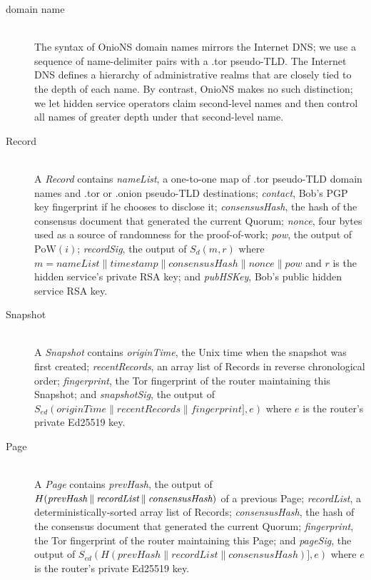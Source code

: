 \documentclass{sig-alternate}
\newcommand*\concat{\mathbin{\|}}
\begin{document}
\begin{description}
	\item[domain name] \hfill \\
		The syntax of OnioNS domain names mirrors the Internet DNS; we use a sequence of name-delimiter pairs with a .tor pseudo-TLD. The Internet DNS defines a hierarchy of administrative realms that are closely tied to the depth of each name. By contrast, OnioNS makes no such distinction; we let hidden service operators claim second-level names and then control all names of greater depth under that second-level name.

	\item[Record] \hfill \\
		A \emph{Record} contains \emph{nameList}, a one-to-one map of .tor pseudo-TLD domain names and .tor or .onion pseudo-TLD destinations; \emph{contact}, Bob's PGP key fingerprint if he chooses to disclose it; \emph{consensusHash}, the hash of the consensus document that generated the current Quorum; \emph{nonce}, four bytes used as a source of randomness for the proof-of-work; \emph{pow}, the output of $ \mathrm{PoW}(i) $; \emph{recordSig}, the output of $ S_{d}(m, r) $ where $ m = \mathit{nameList} \concat \mathit{timestamp} \concat \mathit{consensusHash} \concat \mathit{nonce} \concat \mathit{pow} $ and $ r $ is the hidden service's private RSA key; and \emph{pubHSKey}, Bob's public hidden service RSA key.

	\item[Snapshot] \hfill \\
		A \emph{Snapshot} contains \emph{originTime}, the Unix time when the snapshot was first created; \emph{recentRecords}, an array list of Records in reverse chronological order; \emph{fingerprint}, the Tor fingerprint of the router maintaining this Snapshot; and  \emph{snapshotSig}, the output of $ S_{\mathit{ed}}(\mathit{originTime} \concat \mathit{recentRecords} \concat \mathit{fingerprint}], e) $ where $ e $ is the router's private Ed25519 key.

	\item[Page] \hfill \\
		A \emph{Page} contains \emph{prevHash}, the output of $ H(\emph{prevHash} \concat \emph{recordList} \concat \emph{consensusHash}) $ of a previous Page; \emph{recordList}, a deterministically-sorted array list of Records; \emph{consensusHash}, the hash of the consensus document that generated the current Quorum; \emph{fingerprint}, the Tor fingerprint of the router maintaining this Page; and \emph{pageSig}, the output of $ S_{\mathit{ed}}(H(\mathit{prevHash} \concat \mathit{recordList} \concat \mathit{consensusHash})], e) $ where $ e $ is the router's private Ed25519 key.
		

\end{description}
\end{document}
